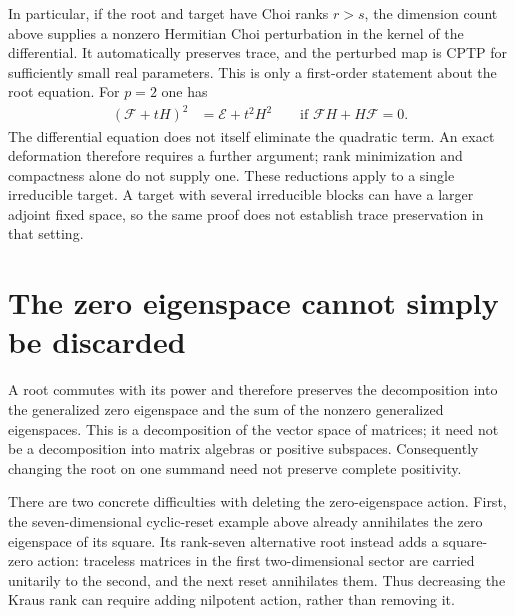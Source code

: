 \documentclass{article}
\begin{document}
In particular, if the root and target have Choi ranks $r>s$, the dimension
count above supplies a nonzero Hermitian Choi perturbation in the kernel
of the differential. It automatically preserves trace, and the perturbed
map is CPTP for sufficiently small real parameters. This is only a
first-order statement about the root equation. For $p=2$ one has
\begin{align}
  (\mathcal F+tH)^2&=\mathcal E+t^2H^2
  \qquad\text{if }\mathcal F H+H\mathcal F=0.
  \label{eq:dccsp17_root_tangent_second_order}
\end{align}
The differential equation does not itself eliminate the quadratic term.
An exact deformation therefore requires a further argument; rank
minimization and compactness alone do not supply one. These reductions
apply to a single irreducible target. A target with several irreducible
blocks can have a larger adjoint fixed space, so the same proof does not
establish trace preservation in that setting.

\section{The zero eigenspace cannot simply be discarded}

A root commutes with its power and therefore preserves the decomposition
into the generalized zero eigenspace and the sum of the nonzero generalized
eigenspaces. This is a decomposition of the vector space of matrices; it
need not be a decomposition into matrix algebras or positive subspaces.
Consequently changing the root on one summand need not preserve complete
positivity.

There are two concrete difficulties with deleting the zero-eigenspace
action. First, the seven-dimensional cyclic-reset example above already
annihilates the zero eigenspace of its square. Its rank-seven alternative
root instead adds a square-zero action: traceless matrices in the first
two-dimensional sector are carried unitarily to the second, and the next
reset annihilates them. Thus decreasing the Kraus rank can require adding
nilpotent action, rather than removing it.
\end{document}
